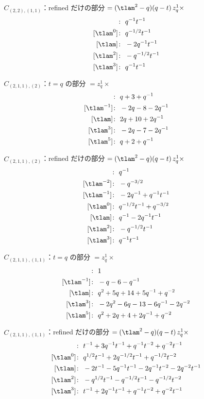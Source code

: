 $\hat C_{(2,2),(1,1)}$：refined だけの部分 $= (\tlam^2 - q)(q - t)\, z_q^{1} \times$
\begin{align*}
[\tlam^{-1}]\colon\ & q^{-1} t^{-1} \\
[\tlam^{0}]\colon\ & q^{-1/2} t^{-1} \\
[\tlam]\colon\ & -2 q^{-1} t^{-1} \\
[\tlam^{2}]\colon\ & -q^{-1/2} t^{-1} \\
[\tlam^{3}]\colon\ & q^{-1} t^{-1}
\end{align*}

$\hat C_{(2,1,1),(2)}$：$t = q$ の部分 $= z_q^{1} \times$
\begin{align*}
[\tlam^{-3}]\colon\ & q +3 +q^{-1} \\
[\tlam^{-1}]\colon\ & -2 q -8 -2 q^{-1} \\
[\tlam]\colon\ & 2 q +10 +2 q^{-1} \\
[\tlam^{3}]\colon\ & -2 q -7 -2 q^{-1} \\
[\tlam^{5}]\colon\ & q +2 +q^{-1}
\end{align*}

$\hat C_{(2,1,1),(2)}$：refined だけの部分 $= (\tlam^2 - q)(q - t)\, z_q^{1} \times$
\begin{align*}
[\tlam^{-3}]\colon\ & q^{-1} \\
[\tlam^{-2}]\colon\ & -q^{-3/2} \\
[\tlam^{-1}]\colon\ & -2 q^{-1} +q^{-1} t^{-1} \\
[\tlam^{0}]\colon\ & q^{-1/2} t^{-1} +q^{-3/2} \\
[\tlam]\colon\ & q^{-1} -2 q^{-1} t^{-1} \\
[\tlam^{2}]\colon\ & -q^{-1/2} t^{-1} \\
[\tlam^{3}]\colon\ & q^{-1} t^{-1}
\end{align*}

$\hat C_{(2,1,1),(1,1)}$：$t = q$ の部分 $= z_q^{1} \times$
\begin{align*}
[\tlam^{-3}]\colon\ & 1 \\
[\tlam^{-1}]\colon\ & -q -6 -q^{-1} \\
[\tlam]\colon\ & q^{2} +5 q +14 +5 q^{-1} +q^{-2} \\
[\tlam^{3}]\colon\ & -2 q^{2} -6 q -13 -6 q^{-1} -2 q^{-2} \\
[\tlam^{5}]\colon\ & q^{2} +2 q +4 +2 q^{-1} +q^{-2}
\end{align*}

$\hat C_{(2,1,1),(1,1)}$：refined だけの部分 $= (\tlam^2 - q)(q - t)\, z_q^{1} \times$
\begin{align*}
[\tlam^{-1}]\colon\ & t^{-1} +3 q^{-1} t^{-1} +q^{-1} t^{-2} +q^{-2} t^{-1} \\
[\tlam^{0}]\colon\ & q^{1/2} t^{-1} +2 q^{-1/2} t^{-1} +q^{-1/2} t^{-2} \\
[\tlam]\colon\ & -2 t^{-1} -5 q^{-1} t^{-1} -2 q^{-1} t^{-2} -2 q^{-2} t^{-1} \\
[\tlam^{2}]\colon\ & -q^{1/2} t^{-1} -q^{-1/2} t^{-1} -q^{-1/2} t^{-2} \\
[\tlam^{3}]\colon\ & t^{-1} +2 q^{-1} t^{-1} +q^{-1} t^{-2} +q^{-2} t^{-1}
\end{align*}


